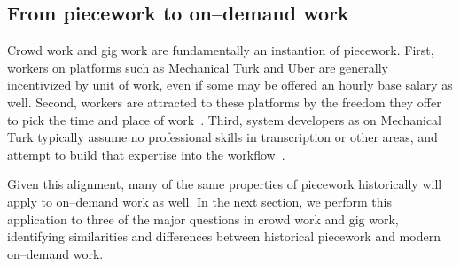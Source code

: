 \documentclass[trackingWork]{subfiles}
\begin{document}
\subsection{From piecework to on--demand work}
Crowd work and gig work are fundamentally an instantion of piecework.
First, workers on platforms such as Mechanical Turk and Uber are generally incentivized by unit of work, even if some may be offered an hourly base salary as well.
Second, workers are attracted to these platforms by the freedom they offer to pick the time and place of work~\cite{martin2014being,whyWouldAnyoneBrewer}.
Third, system developers as on Mechanical Turk typically assume no professional skills in transcription or other areas, and attempt to build that expertise into the workflow~\cite{noronha2011platemate,bernsteinSoylent}.

Given this alignment, many of the same properties of piecework historically will apply to on--demand work as well. In the next section, we perform this application to three of the major questions in crowd work and gig work, identifying similarities and differences between historical piecework and modern on--demand work.

\onlyinsubfile{
  \printbibliography
  }
\end{document}
